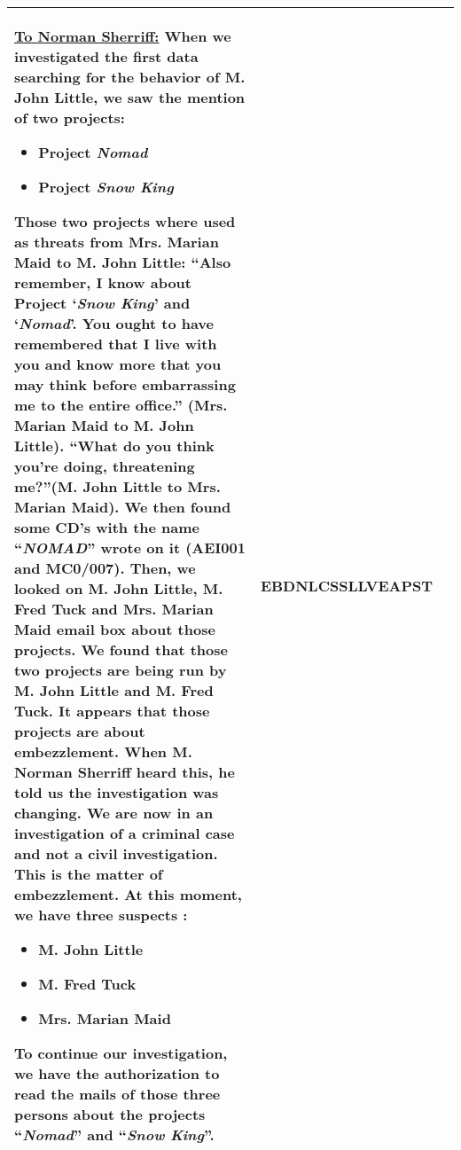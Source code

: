 \begin{longtable}{|p{}|p{}|p{}|}
		\underline{\textbf{To Norman Sherriff:}}\newline
		When we investigated the first data searching for the behavior of M. John Little, we saw the mention of two projects:
		\begin{itemize}
			\item Project \textit{Nomad}
			\item Project \textit{Snow King}
		\end{itemize}
		Those two projects where used as threats from Mrs. Marian Maid to M. John Little:
		\enquote{Also remember, I know about Project \enquote{\textit{Snow King}} and \enquote{\textit{Nomad}}. You ought to have remembered that I live with you and know more that you may think before embarrassing me to the entire office.} (Mrs. Marian Maid to M. John Little).\newline
		\enquote{What do you think you're doing, threatening me?}(M. John Little to Mrs. Marian Maid).\newline
		We then found some CD’s with the name \enquote{\textit{NOMAD}} wrote on it (AEI001 and MC0/007).\newline
		Then, we looked on M. John Little, M. Fred Tuck and Mrs. Marian Maid email box about those projects.\newline
		We found that those two projects are being run by M. John Little and M. Fred Tuck. It appears that those projects are about embezzlement.\newline
		When M. Norman Sherriff heard this, he told us the investigation was changing. We are now in an investigation of a criminal case and not a civil investigation.\newline
		This is the matter of embezzlement. At this moment, we have three suspects :
		\begin{itemize}
			\item M. John Little
			\item M. Fred Tuck
			\item Mrs. Marian Maid
		\end{itemize}
		To continue our investigation, we have the authorization to read the mails of those three persons about the projects \enquote{\textit{Nomad}} and \enquote{\textit{Snow King}}. & EBDN\newline LCSS\newline LLVE\newline APST\\\hline

\end{longtable}
